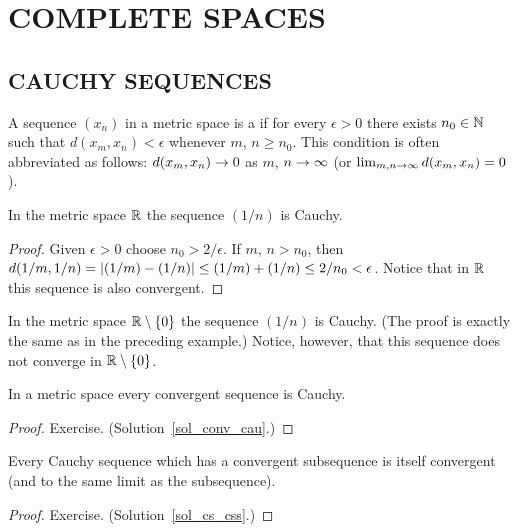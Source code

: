 \chapter{COMPLETE SPACES}

\section{CAUCHY SEQUENCES}
\begin{defn} A sequence $(x_n)$ in a metric space is a
 if for every $\epsilon > 0$ there exists $n_0 \in \mathbb{N}$ such that
$d(x_m,x_n) < \epsilon$ whenever $m$, $n \ge n_0$. This condition is often abbreviated as
follows: $d(x_m, x_n) \rightarrow 0$ as $m$, $n \rightarrow \infty$ (or $\lim_{m,n \rightarrow \infty}d(x_m,x_n) =
0$).
\end{defn}

\begin{exam} In the metric space $\mathbb{R}$ the sequence $(1/n)$ is Cauchy.
\end{exam}

\begin{proof} Given $\epsilon > 0$ choose $n_0 > 2/\epsilon$. If $m$, $n > n_0$, then $d(1/m, 1/n)
= \lvert(1/m) - (1/n)\rvert  \le (1/m) + (1/n) \le 2/n_0 < \epsilon$.  Notice that in $\mathbb{R}$ this
sequence is also convergent.
\end{proof}

\begin{exam}\label{compl_exm1} In the metric space $\mathbb{R} \setminus \{0\}$ the sequence $(1/n)$
is Cauchy. (The proof is exactly the same as in the preceding example.)  Notice, however, that
this sequence does not converge in $\mathbb{R} \setminus \{0\}$.
\end{exam}

\begin{prop}\label{conv_cau} In a metric space every convergent sequence is Cauchy.
\end{prop}

\begin{proof} Exercise.  (Solution~\ref{sol_conv_cau}.)
  \ns  \end{proof}

\begin{prop}\label{cs_css} Every Cauchy sequence which has a convergent subsequence is itself
convergent (and to the same limit as the subsequence).
\end{prop}

\begin{proof} Exercise.   (Solution~\ref{sol_cs_css}.)  \ns  \end{proof}

